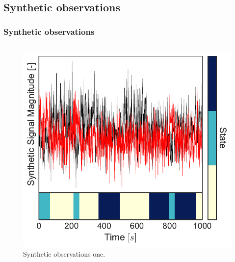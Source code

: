 \documentclass[aspectratio=169]{beamer}
\begin{document}
    \subsection{Synthetic observations}
    \begin{frame}
        \frametitle{Synthetic observations}

        \begin{columns}[c] 


            \begin{figure}
                \includegraphics[width=1.0\linewidth]{synthetic-data-plot-data1.pdf}
                \caption{Synthetic observations one.}
            \end{figure}



\end{columns}
\end{frame}
\end{document}
